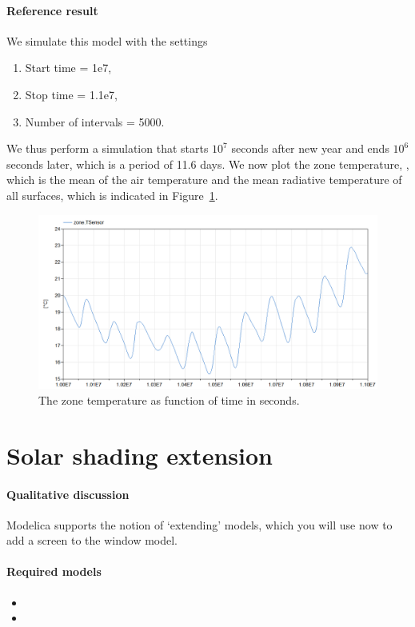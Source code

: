 \documentclass[10pt,a4paper]{article}
\begin{document}
\paragraph{Reference result}
We simulate this model with the settings
\begin{enumerate}
\item Start time = 1e7,
\item Stop time = 1.1e7,
\item Number of intervals = 5000.
\end{enumerate}
We thus perform a simulation that starts $10^7$ seconds after new year and ends $10^6$
seconds later, which is a period of 11.6 days.
We now plot the zone temperature, ,
which is the mean of the air temperature and the mean radiative 
temperature of all surfaces, which is indicated in Figure~\ref{fig:res1}.

\begin{figure}[h!]
\centering
\includegraphics[scale=0.65]{Example1.png}
\caption{The zone temperature as function of time in seconds.}
\label{fig:res1}
\end{figure}

\newpage

\section{Solar shading extension}
\paragraph{Qualitative discussion}
Modelica supports the notion of `extending' models, which you will
use now to add a screen to the window model.

\paragraph{Required models}
\begin{itemize}
\item {}
\item {}
\end{itemize}
\end{document}
